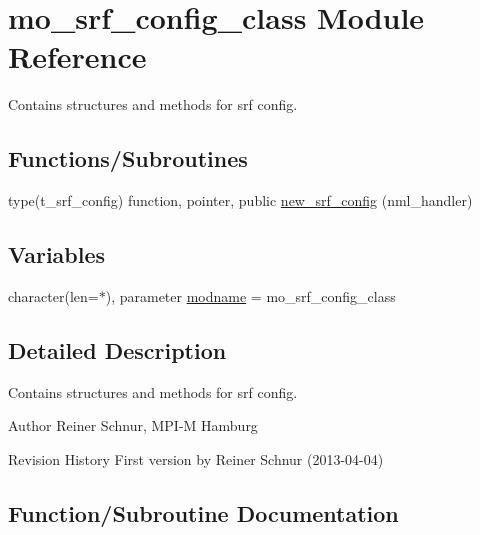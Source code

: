 \hypertarget{namespacemo__srf__config__class}{}\section{mo\+\_\+srf\+\_\+config\+\_\+class Module Reference}
\label{namespacemo__srf__config__class}


Contains structures and methods for srf config.  


\subsection*{Functions/\+Subroutines}
\begin{DoxyCompactItemize}
\item 
type(t\+\_\+srf\+\_\+config) function, pointer, public \hyperlink{namespacemo__srf__config__class_ab74df301c0b4a0a8c1b10dfd0fdee25c}{new\+\_\+srf\+\_\+config} (nml\+\_\+handler)
\end{DoxyCompactItemize}
\subsection*{Variables}
\begin{DoxyCompactItemize}
\item 
character(len=$\ast$), parameter \hyperlink{namespacemo__srf__config__class_af7402e483a2efefdc0024b5e431a70e1}{modname} = \textquotesingle{}mo\+\_\+srf\+\_\+config\+\_\+class\textquotesingle{}
\end{DoxyCompactItemize}


\subsection{Detailed Description}
Contains structures and methods for srf config. 

\begin{DoxyAuthor}{Author}
Reiner Schnur, M\+P\+I-\/\+M Hamburg
\end{DoxyAuthor}
\begin{DoxyParagraph}{Revision History}
First version by Reiner Schnur (2013-\/04-\/04) 
\end{DoxyParagraph}


\subsection{Function/\+Subroutine Documentation}
\hypertarget{namespacemo__srf__config__class_ab74df301c0b4a0a8c1b10dfd0fdee25c}{}
